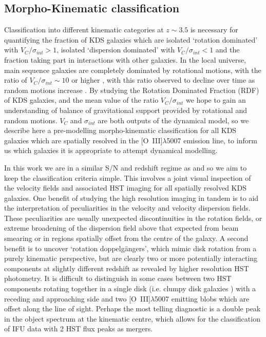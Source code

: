 \documentclass[fleqn,usenatbib]{mn2e}
\begin{document}
\subsection{Morpho-Kinematic classification}\label{subsec:morpho-kin-class}
Classification into different kinematic categories at $z \sim 3.5$ is necessary for quantifying the fraction of KDS galaxies which are isolated `rotation dominated' with $V_{C}/\sigma_{int} > 1$, isolated `dispersion dominated' with $V_{C}/\sigma_{int} < 1$ and the fraction taking part in interactions with other galaxies.
In the local universe, main sequence galaxies are completely dominated by rotational motions, with the ratio of $V_{C}/\sigma_{int} \sim 10$ or higher \citep{Epinat2008,Epinat2008a}, with this ratio observed to decline over time as random motions increase \citep[e.g.][]{ForsterSchreiber2009,Law2009,Epinat2012,Wisnioski2015,Stott2016}.
By studying the Rotation Dominated Fraction (RDF) of KDS galaxies, and the mean value of the ratio $V_{C}/\sigma_{int}$ we hope to gain an understanding of balance of gravitational support provided by rotational and random motions.
$V_{C}$ and $\sigma_{int}$ are both outputs of the dynamical model, so we describe here a pre-modelling morpho-kinematic classification for all KDS galaxies which are spatially resolved in the [O~{\sc III}]$\lambda$5007 emission line, to inform us which galaxies it is appropriate to attempt dynamical modelling. 

In this work we are in a similar S/N and redshift regime as \cite{Gnerucci2011} and so we aim to keep the classification criteria simple.
This involves a joint visual inspection of the velocity fields and associated HST imaging for all spatially resolved KDS galaxies.
One benefit of studying the high resolution imaging in tandem is to aid the interpretation of peculiarities in the velocity and velocity dispersion fields.
These peculiarities are usually unexpected discontinuities in the rotation fields, or extreme broadening of the dispersion field above that expected from beam smearing or in regions spatially offset from the centre of the galaxy.
A second benefit is to uncover `rotation doppelg{\"a}ngers', which mimic disk rotation from a purely kinematic perspective, but are clearly two or more potentially interacting components at slightly different redshift as revealed by higher resolution HST photometry.
It is difficult to distinguish in some cases between two HST components rotating together in a single disk (i.e. clumpy disk galaxies \citep[e.g.][]{Elmegreen2004,Bournaud2007}) with a receding and approaching side and two [O~{\sc III}]$\lambda$5007 emitting blobs which are offset along the line of sight.
Perhaps the most telling diagnostic is a double peak in the object spectrum at the kinematic centre, which allows for the classification of IFU data with 2 HST flux peaks as mergers.
\end{document}
